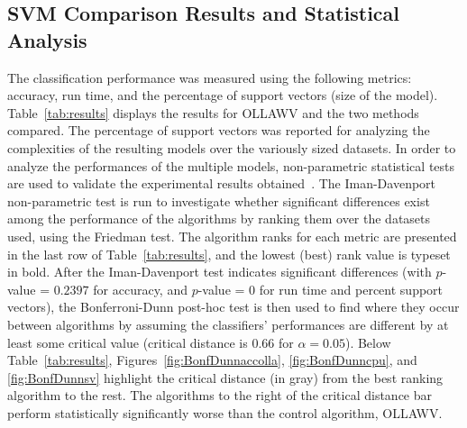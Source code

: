 \documentclass[reqno]{vcuthesis}
\numberwithin{equation}{chapter}
\begin{document}
\subsection{SVM Comparison Results and Statistical Analysis}\label{subsec:ollawvresults}
The classification performance was measured using the following metrics: accuracy, run time, and the percentage of support vectors (size of the model). Table~\ref{tab:results} displays the results for OLLAWV and the two methods compared. The percentage of support vectors was reported for analyzing the complexities of the resulting models over the variously sized datasets. In order to analyze the performances of the multiple models, non-parametric statistical tests are used to validate the experimental results obtained~\cite{Derrac2011}. The Iman-Davenport non-parametric test is run to investigate whether significant differences exist among the performance of the algorithms by ranking them over the datasets used, using the Friedman test. The algorithm ranks for each metric are presented in the last row of Table~\ref{tab:results}, and the lowest (best) rank value is typeset in bold. After the Iman-Davenport test indicates significant differences (with $p$-value =  $0.2397$ for accuracy, and $p$-value =  $0$ for run time and percent support vectors), the Bonferroni-Dunn post-hoc test is then used to find where they occur between algorithms by assuming the classifiers' performances are different by at least some critical value (critical distance is $0.66$ for $\alpha = 0.05$). Below Table~\ref{tab:results}, Figures~\ref{fig:BonfDunnaccolla}, \ref{fig:BonfDunncpu}, and \ref{fig:BonfDunnsv} highlight the critical distance (in gray) from the best ranking algorithm to the rest. The algorithms to the right of the critical distance bar perform statistically significantly worse than the control algorithm, OLLAWV.
\end{document}
